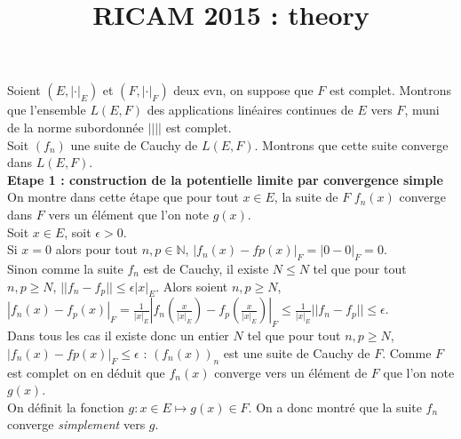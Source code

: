 \documentclass[12pt]{article}
\date{}
\title{RICAM 2015 : theory }
\newcommand{\NN}{\mathbb{N}}
\begin{document}
Soient $(E,|\cdot|_E)$ et $(F,|\cdot|_F)$ deux evn, on suppose que $F$ est complet. Montrons que l'ensemble $L(E,F)$ des applications lin\'eaires continues de $E$ vers $F$, muni de la norme subordonn\'ee $|| ||$ est complet. \\
Soit $(f_n)$ une suite de Cauchy de $L(E,F)$. Montrons que cette suite converge dans $L(E,F)$.\\

\textbf{Etape 1 : construction de la potentielle limite par convergence simple}\\
On montre dans cette \'etape que pour tout $x\in E$, la suite de $F$ $f_n(x)$ converge dans $F$ vers un \'el\'ement que l'on note $g(x)$. \\
Soit $x \in E$, soit $\epsilon >0$.\\ Si $x=0$ alors pour tout $n,p \in \NN$, $|f_n(x) - fp(x)|_F = |0-0|_F=0$.\\
Sinon comme la suite $f_n$ est de Cauchy, il existe $N \leq N$ tel que pour tout $n,p \geq N$, $||f_n -f_p||\leq \epsilon  |x|_E$. Alors soient $n,p \geq N$, 
$|f_n(x) - f_p(x)|_F = \frac{1}{|x|_E} |f_n(\frac{x}{|x|_E})- f_p(\frac{x}{|x|_E})|_F \leq \frac{1}{|x|_E} ||f_n -f_p|| \leq \epsilon$. \\
Dans tous les cas il existe donc un entier $N $ tel que pour tout $n,p \geq N$,  $|f_n(x) - fp(x)|_F \leq \epsilon$ : $(f_n (x))_n$ est une suite de Cauchy de $F$. Comme $F$ est complet on en d\'eduit que $f_n (x)$ converge vers un \'el\'ement de $F$ que l'on note $g(x)$.\\
On d\'efinit la fonction $g: x \in E \mapsto g(x) \in F$. On a donc montr\'e que la suite $f_n$ converge \textit{simplement} vers $g$.
\end{document}
